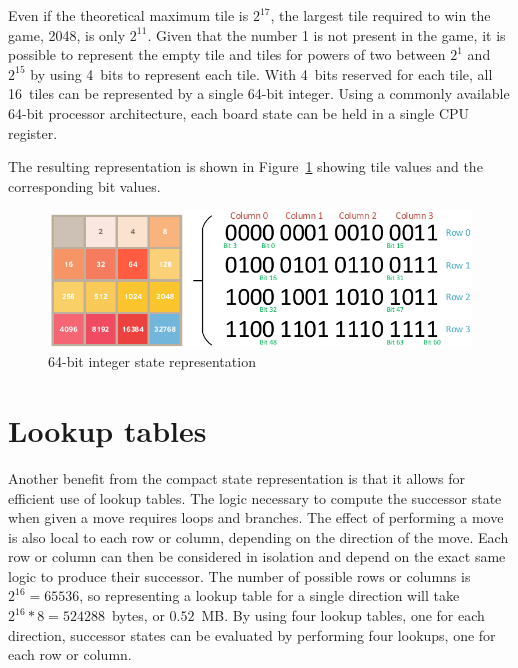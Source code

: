 Even if the theoretical maximum tile is $2^{17}$, the largest tile required to win the game, 2048, is only $2^{11}$. Given that the number 1 is not present in the game, it is possible to represent the empty tile and tiles for powers of two between $2^1$ and $2^{15}$ by using 4~bits to represent each tile. With 4~bits reserved for each tile, all 16~tiles can be represented by a single 64-bit integer. Using a commonly available 64-bit processor architecture, each board state can be held in a single CPU register.

The resulting representation is shown in Figure~\ref{figure:represent} showing tile values and the corresponding bit values.

\begin{figure}[H]
\centering
\includegraphics[scale=1.0]{images/2048_state}
\caption{64-bit integer state representation}
\label{figure:represent}
\end{figure}

\section*{Lookup tables}

Another benefit from the compact state representation is that it allows for efficient use of lookup tables. The logic necessary to compute the successor state when given a move requires loops and branches. The effect of performing a move is also local to each row or column, depending on the direction of the move. Each row or column can then be considered in isolation and depend on the exact same logic to produce their successor. The number of possible rows or columns is $2^{16}=65536$, so representing a lookup table for a single direction will take $2^{16}*8=524288$~bytes, or $0.52$~MB. By using four lookup tables, one for each direction, successor states can be evaluated by performing four lookups, one for each row or column.

